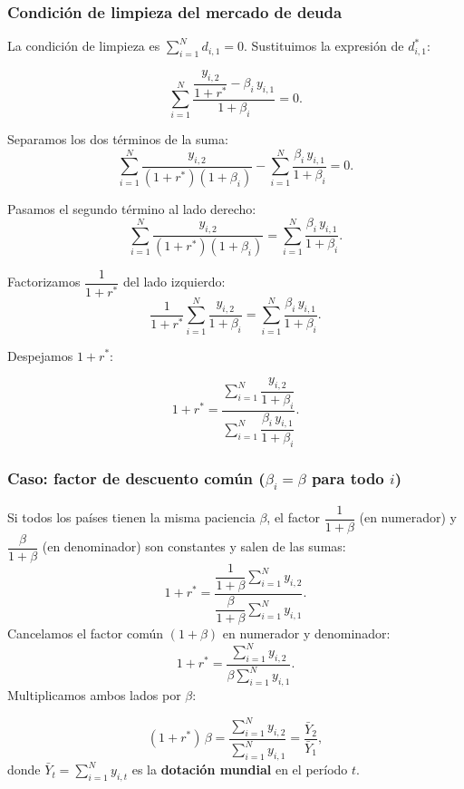 \subsubsection*{Condición de limpieza del mercado de deuda}

La condición de limpieza es $\displaystyle\sum_{i=1}^{N} d_{i,1} = 0$.
Sustituimos la expresión de $d_{i,1}^*$:

\[
    \sum_{i=1}^{N}
    \frac{\dfrac{y_{i,2}}{1+r^*} - \beta_i\,y_{i,1}}{1+\beta_i} = 0.
\]

Separamos los dos términos de la suma:
\[
    \sum_{i=1}^{N} \frac{y_{i,2}}{(1+r^*)(1+\beta_i)}
    - \sum_{i=1}^{N} \frac{\beta_i\,y_{i,1}}{1+\beta_i} = 0.
\]

Pasamos el segundo término al lado derecho:
\[
    \sum_{i=1}^{N} \frac{y_{i,2}}{(1+r^*)(1+\beta_i)}
    = \sum_{i=1}^{N} \frac{\beta_i\,y_{i,1}}{1+\beta_i}.
\]

Factorizamos $\dfrac{1}{1+r^*}$ del lado izquierdo:
\[
    \frac{1}{1+r^*}\sum_{i=1}^{N} \frac{y_{i,2}}{1+\beta_i}
    = \sum_{i=1}^{N} \frac{\beta_i\,y_{i,1}}{1+\beta_i}.
\]

Despejamos $1+r^*$:

\begin{resultado}
\begin{equation}\label{eq:rstar}
    1 + r^* = \dfrac{\displaystyle\sum_{i=1}^{N} \dfrac{y_{i,2}}{1+\beta_i}}
                    {\displaystyle\sum_{i=1}^{N} \dfrac{\beta_i\,y_{i,1}}{1+\beta_i}}.
    \tag{23}
\end{equation}
\end{resultado}

\subsubsection*{Caso: factor de descuento común ($\beta_i = \beta$ para todo $i$)}

Si todos los países tienen la misma paciencia $\beta$, el factor
$\dfrac{1}{1+\beta}$ (en numerador) y $\dfrac{\beta}{1+\beta}$ (en denominador)
son constantes y salen de las sumas:
\[
    1 + r^* = \dfrac{\dfrac{1}{1+\beta}\displaystyle\sum_{i=1}^{N} y_{i,2}}
               {\dfrac{\beta}{1+\beta}\displaystyle\sum_{i=1}^{N} y_{i,1}}.
\]
Cancelamos el factor común $(1+\beta)$ en numerador y denominador:
\[
    1 + r^* = \frac{\displaystyle\sum_{i=1}^{N} y_{i,2}}
                   {\beta \displaystyle\sum_{i=1}^{N} y_{i,1}}.
\]
Multiplicamos ambos lados por $\beta$:

\begin{resultado}
\[
    (1+r^*)\,\beta = \frac{\displaystyle\sum_{i=1}^{N} y_{i,2}}
                          {\displaystyle\sum_{i=1}^{N} y_{i,1}}
                  = \frac{\bar{Y}_2}{\bar{Y}_1},
\]
donde $\bar{Y}_t = \sum_{i=1}^N y_{i,t}$ es la \textbf{dotación mundial} en el
período $t$.
\end{resultado}

